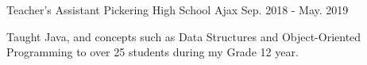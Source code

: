 \begin{cventries}
  \cventry
    {Teacher's Assistant} %
    {Pickering High School} %
    {Ajax} %
    {Sep. 2018 - May. 2019} %
    {
      \begin{cvitems} %
        \item {Taught Java, and concepts such as Data Structures and Object-Oriented Programming to over 25 students during my Grade 12 year.}
      \end{cvitems}
    }


\end{cventries}
